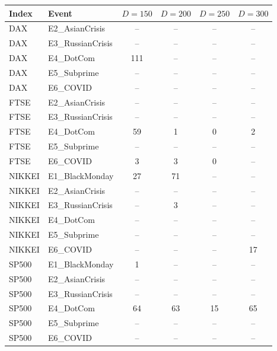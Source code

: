\begin{tabular}{llcccc}
\toprule
Index & Event & $D = 150$ & $D = 200$ & $D = 250$ & $D = 300$ \\
\midrule
DAX & E2\_AsianCrisis & -- & -- & -- & -- \\
DAX & E3\_RussianCrisis & -- & -- & -- & -- \\
DAX & E4\_DotCom & 111 & -- & -- & -- \\
DAX & E5\_Subprime & -- & -- & -- & -- \\
DAX & E6\_COVID & -- & -- & -- & -- \\
\addlinespace
FTSE & E2\_AsianCrisis & -- & -- & -- & -- \\
FTSE & E3\_RussianCrisis & -- & -- & -- & -- \\
FTSE & E4\_DotCom & 59 & 1 & 0 & 2 \\
FTSE & E5\_Subprime & -- & -- & -- & -- \\
FTSE & E6\_COVID & 3 & 3 & 0 & -- \\
\addlinespace
NIKKEI & E1\_BlackMonday & 27 & 71 & -- & -- \\
NIKKEI & E2\_AsianCrisis & -- & -- & -- & -- \\
NIKKEI & E3\_RussianCrisis & -- & 3 & -- & -- \\
NIKKEI & E4\_DotCom & -- & -- & -- & -- \\
NIKKEI & E5\_Subprime & -- & -- & -- & -- \\
NIKKEI & E6\_COVID & -- & -- & -- & 17 \\
\addlinespace
SP500 & E1\_BlackMonday & 1 & -- & -- & -- \\
SP500 & E2\_AsianCrisis & -- & -- & -- & -- \\
SP500 & E3\_RussianCrisis & -- & -- & -- & -- \\
SP500 & E4\_DotCom & 64 & 63 & 15 & 65 \\
SP500 & E5\_Subprime & -- & -- & -- & -- \\
SP500 & E6\_COVID & -- & -- & -- & -- \\
\bottomrule
\end{tabular}

